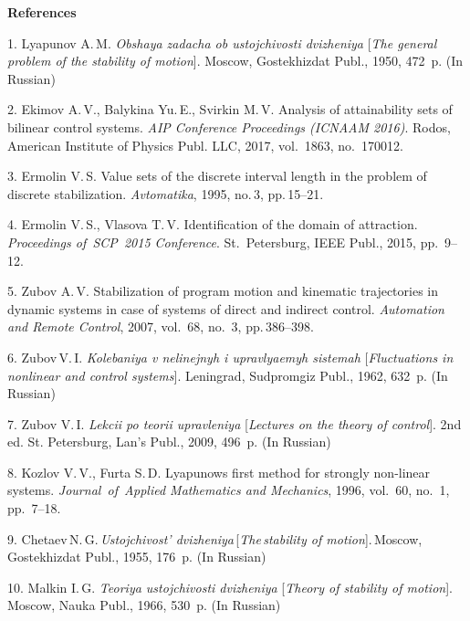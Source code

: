 

{\small



\vskip6mm

\noindent \textbf{References} }

\vskip 2mm

{\footnotesize

1. Lyapunov A.\,M.  \textit{Obshaya            %
zadacha ob ustojchivosti dvizheniya} [\textit{The general problem
of the stability of
motion}]. Moscow, Gostekhizdat Publ., 1950, 472~p. (In Russian) %

2. Ekimov A.\,V., Balykina Yu.\,E.,  Svirkin     %
M.\,V. Analysis of attainability sets of bilinear control systems.
\textit{AIP Conference Proceedings (ICNAAM 2016)}. Rodos, American
Insti\-tu\-te of Physics Publ. LLC, 2017, vol.~1863, no.~170012.

3. Ermolin V.\,S. Value sets of the             %
discrete interval length in the problem of discrete stabilization.
\textit{Avtomatika}, 1995, no.\,3, pp.\,15--21.

4. Ermolin V.\,S., Vlasova T.\,V.          %
Identification of the domain of attraction. \textit{Proceedings
of~SCP~2015 Conference}. St.~Petersburg, IEEE Publ., 2015,
pp.~9--12.

5. Zubov A.\,V. Stabilization of program        %
motion and kinematic trajectories in dynamic systems in case of
systems of direct and indirect control. \textit{Automation and
Remote Control}, 2007, vol.~68, no.~3, pp.\,386--398.

6. Zubov\,V.\,I. \textit{Kolebaniya v          %
nelinejnyh i upravlyaemyh sistemah} [\textit{Fluctuations in
nonlinear and control systems}]. Leningrad, Sudpromgiz Publ.,
1962, 632~p. (In Russian)

7. Zubov V.\,I. \textit{Lekcii po teorii        %
upravleniya} [\textit{Lectures on the theory of control}]. 2nd ed.
St. Petersburg, Lan's Publ., 2009, 496~p. (In Russian)

8. Kozlov V.\,V., Furta S.\,D. Lyapunows first         %
method for strongly non-linear systems. \textit{Journal~of~Applied
Mathematics and Mechanics}, 1996, vol.~60, no.~1, pp.~7--18.

9. Chetaev\,N.\,G.\,\textit{Ustojchivost'           %
dvizheniya}\,[\textit{The\,stability of
motion}].\,Moscow,\,Gostekhizdat Publ., 1955, 176~p. (In Russian)

10. Malkin I.\,G.  \textit{Teoriya                  %
ustojchivosti dvizheniya} [\textit{Theory of stability of
motion}]. Moscow, Nauka Publ., 1966, 530~p. (In Russian)

}
